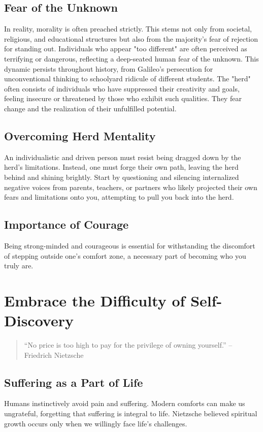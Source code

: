 \subsection*{Fear of the Unknown}
In reality, morality is often preached strictly. This stems not only from societal, religious, and educational structures but also from the majority's fear of rejection for standing out. Individuals who appear "too different" are often perceived as terrifying or dangerous, reflecting a deep-seated human fear of the unknown. This dynamic persists throughout history, from Galileo's persecution for unconventional thinking to schoolyard ridicule of different students. The "herd" often consists of individuals who have suppressed their creativity and goals, feeling insecure or threatened by those who exhibit such qualities. They fear change and the realization of their unfulfilled potential.

\subsection*{Overcoming Herd Mentality}
An individualistic and driven person must resist being dragged down by the herd's limitations. Instead, one must forge their own path, leaving the herd behind and shining brightly. Start by questioning and silencing internalized negative voices from parents, teachers, or partners who likely projected their own fears and limitations onto you, attempting to pull you back into the herd.

\subsection*{Importance of Courage}
Being strong-minded and courageous is essential for withstanding the discomfort of stepping outside one's comfort zone, a necessary part of becoming who you truly are.

\section{Embrace the Difficulty of Self-Discovery}

\begin{quote}
    “No price is too high to pay for the privilege of owning yourself.” -- Friedrich Nietzsche
\end{quote}

\subsection*{Suffering as a Part of Life}
Humans instinctively avoid pain and suffering. Modern comforts can make us ungrateful, forgetting that suffering is integral to life. Nietzsche believed spiritual growth occurs only when we willingly face life's challenges.

